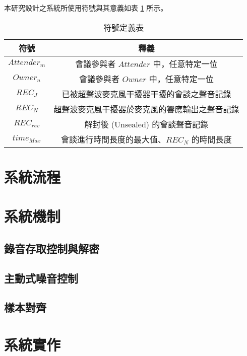     本研究設計之系統所使用符號與其意義如表 \ref{table:tab.symbol} 所示。

\begin{table}[H]
    \centering
    \caption{符號定義表}
    \label{table:tab.symbol}
    \begin{tabular}{ c c }
        \hline
        \bf{符號} & \bf{釋義} \\
        \hline
        $Attender_{m}$ & 會議參與者 $Attender$ 中，任意特定一位 \\
        $Owner_{n}$    & 會議參與者 $Owner$ 中，任意特定一位 \\
        $REC_{J}$      & 已被超聲波麥克風干擾器干擾的會談之聲音記錄 \\
        $REC_{N}$      & 超聲波麥克風干擾器於麥克風的響應輸出之聲音記錄 \\
        $REC_{rev}$    & 解封後 (Unsealed) 的會談聲音記錄 \\
        $time_{Max}$   & 會談進行時間長度的最大值、$REC_{N}$ 的時間長度 \\
    \end{tabular}
\end{table}

\section{系統流程}

\section{系統機制}

\subsection{錄音存取控制與解密}

\subsection{主動式噪音控制}

\subsection{樣本對齊}

\section{系統實作}
